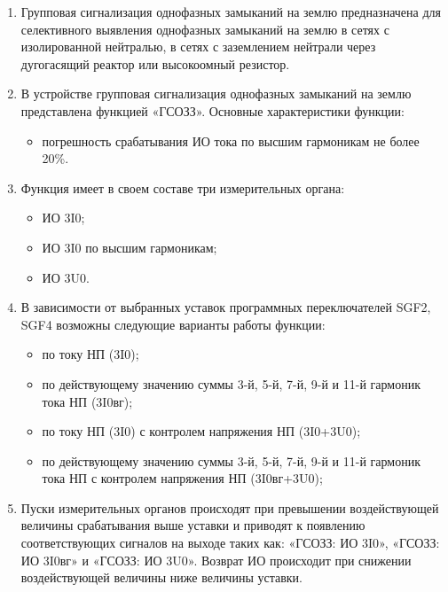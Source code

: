 
\color{black}

\begin{enumerate}

\item
Групповая сигнализация однофазных замыканий на землю предназначена для селективного выявления однофазных замыканий на землю в сетях с изолированной нейтралью, в сетях с заземлением нейтрали через дугогасящий реактор или высокоомный резистор. 

\item В устройстве групповая сигнализация однофазных замыканий на землю представлена функцией «ГСОЗЗ». Основные характеристики функции:
\begin{itemize}
    \item погрешность срабатывания ИО тока по высшим гармоникам не более 20\%.
\end{itemize}

\item
Функция имеет в своем составе три измерительных органа:
\begin{itemize}
    \item ИО 3I0;
    \item ИО 3I0 по высшим гармоникам;
    \item ИО 3U0.
\end{itemize}

\item 
В зависимости от выбранных уставок программных переключателей SGF2, SGF4 возможны следующие варианты работы функции:
\begin{itemize}
    \item по току НП (3I0);
    \item по действующему значению суммы 3-й, 5-й, 7-й, 9-й и 11-й гармоник тока НП (3I0вг);
    \item по току НП (3I0) с контролем напряжения НП (3I0+3U0);
    \item по действующему значению суммы 3-й, 5-й, 7-й, 9-й и 11-й гармоник тока НП с контролем напряжения НП (3I0вг+3U0);
\end{itemize}

\item 
Пуски измерительных органов происходят при превышении воздействующей величины срабатывания выше уставки и приводят к появлению соответствующих сигналов на выходе таких как: «ГСОЗЗ: ИО 3I0», «ГСОЗЗ: ИО 3I0вг» и «ГСОЗЗ: ИО 3U0». Возврат ИО происходит при снижении воздействующей величины ниже величины уставки.


\end{enumerate}
